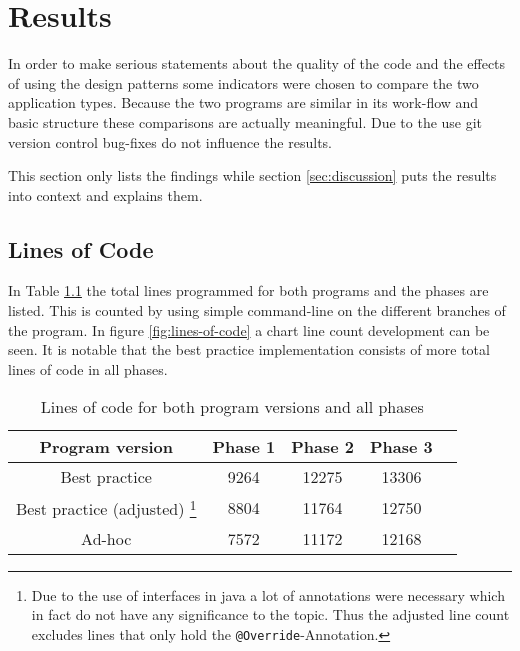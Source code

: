 \chapter{Results}
In order to make serious statements about the quality of the code and the effects of using the design patterns some indicators were chosen to compare the two application types. Because the two programs are similar in its work-flow and basic structure these comparisons are actually meaningful. Due to the use git version control bug-fixes do not influence the results. 

This section only lists the findings while section \ref{sec:discussion} puts the results into context and explains them.

\section{Lines of Code}
\label{sec:line-count}
In Table \ref{table:lines-of-code} the total lines programmed for both programs and the phases are listed. This is counted by using simple command-line on the different branches of the program. In figure \ref{fig:lines-of-code} a chart line count development can be seen. It is notable that the best practice implementation consists of more total lines of code in all phases. 

\begin{table}[htbp]
	\centering
	\label{table:lines-of-code}
	\begin{tabular}{|c|c|c|c|c|} \hline
	\textbf{Program version} &\textbf{Phase 1} & \textbf{Phase 2} & \textbf{Phase 3} \\ \hline
	Best practice & 9264 & 12275 & 13306 \\ \hline
	Best practice (adjusted) \footnote{Due to the use of interfaces in java a lot of annotations were necessary which in fact do not have any significance to the topic. Thus the adjusted line count excludes lines that only hold the \texttt{@Override}-Annotation.} & 8804 & 11764 & 12750 \\ \hline
	Ad-hoc & 7572 & 11172 & 12168 \\ \hline
	\end{tabular}
	\caption{Lines of code for both program versions and all phases}
\end{table}

